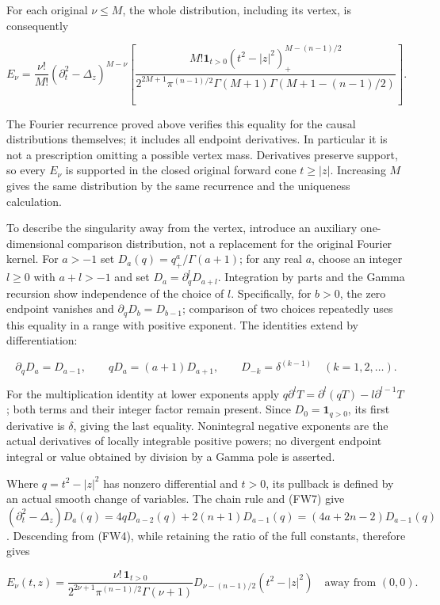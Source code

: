\documentclass[
  11pt,
]{article}
\begin{document}
For each original \(\nu\leq M\), the whole distribution, including its
vertex, is consequently

\[
 E_\nu=\frac{\nu!}{M!}(\partial_t^2-\Delta_z)^{M-\nu}
      \left[
       \frac{M!\boldsymbol1_{t>0}(t^2-|z|^2)_+^{M-(n-1)/2}}
       {2^{2M+1}\pi^{(n-1)/2}\Gamma(M+1)
                              \Gamma(M+1-(n-1)/2)}
      \right].\tag{FW6}
\]

The Fourier recurrence proved above verifies this equality for the
causal distributions themselves; it includes all endpoint derivatives.
In particular it is not a prescription omitting a possible vertex mass.
Derivatives preserve support, so every \(E_\nu\) is supported in the
closed original forward cone \(t\geq|z|\). Increasing \(M\) gives the
same distribution by the same recurrence and the uniqueness calculation.

To describe the singularity away from the vertex, introduce an auxiliary
one-dimensional comparison distribution, not a replacement for the
original Fourier kernel. For \(a>-1\) set \(D_a(q)=q_+^a/\Gamma(a+1)\);
for any real \(a\), choose an integer \(l\geq0\) with \(a+l>-1\) and set
\(D_a=\partial_q^lD_{a+l}\). Integration by parts and the Gamma
recursion show independence of the choice of \(l\). Specifically, for
\(b>0\), the zero endpoint vanishes and \(\partial_qD_b=D_{b-1}\);
comparison of two choices repeatedly uses this equality in a range with
positive exponent. The identities extend by differentiation:

\[
 \partial_qD_a=D_{a-1},\qquad qD_a=(a+1)D_{a+1},\qquad
 D_{-k}=\delta^{(k-1)}\quad(k=1,2,\ldots).\tag{FW7}
\]

For the multiplication identity at lower exponents apply
\(q\partial^l T=\partial^l(qT)-l\partial^{l-1}T\); both terms and their
integer factor remain present. Since \(D_0=\boldsymbol1_{q>0}\), its
first derivative is \(\delta\), giving the last equality. Nonintegral
negative exponents are the actual derivatives of locally integrable
positive powers; no divergent endpoint integral or value obtained by
division by a Gamma pole is asserted.

Where \(q=t^2-|z|^2\) has nonzero differential and \(t>0\), its pullback
is defined by an actual smooth change of variables. The chain rule and
(FW7) give \((\partial_t^2-\Delta_z)D_a(q)=4qD_{a-2}(q)+2(n+1)D_{a-1}(q)
=(4a+2n-2)D_{a-1}(q)\). Descending from (FW4), while retaining the ratio
of the full constants, therefore gives

\[
 E_\nu(t,z)=
  \frac{\nu!\,\boldsymbol1_{t>0}}
             {2^{2\nu+1}\pi^{(n-1)/2}\Gamma(\nu+1)}
        D_{\nu-(n-1)/2}(t^2-|z|^2)
 \quad\text{away from }(0,0).\tag{FW8}
\]
\end{document}
